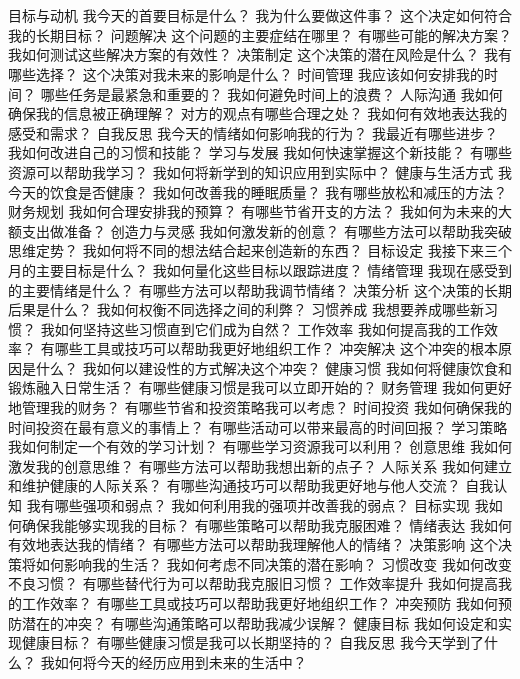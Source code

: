 \documentclass[12pt]{book}
\begin{document}
\section{}
目标与动机
我今天的首要目标是什么？
我为什么要做这件事？
这个决定如何符合我的长期目标？
问题解决
这个问题的主要症结在哪里？
有哪些可能的解决方案？
我如何测试这些解决方案的有效性？
决策制定
这个决策的潜在风险是什么？
我有哪些选择？
这个决策对我未来的影响是什么？
时间管理
我应该如何安排我的时间？
哪些任务是最紧急和重要的？
我如何避免时间上的浪费？
人际沟通
我如何确保我的信息被正确理解？
对方的观点有哪些合理之处？
我如何有效地表达我的感受和需求？
自我反思
我今天的情绪如何影响我的行为？
我最近有哪些进步？
我如何改进自己的习惯和技能？
学习与发展
我如何快速掌握这个新技能？
有哪些资源可以帮助我学习？
我如何将新学到的知识应用到实际中？
健康与生活方式
我今天的饮食是否健康？
我如何改善我的睡眠质量？
我有哪些放松和减压的方法？
财务规划
我如何合理安排我的预算？
有哪些节省开支的方法？
我如何为未来的大额支出做准备？
创造力与灵感
我如何激发新的创意？
有哪些方法可以帮助我突破思维定势？
我如何将不同的想法结合起来创造新的东西？
目标设定
我接下来三个月的主要目标是什么？
我如何量化这些目标以跟踪进度？
情绪管理
我现在感受到的主要情绪是什么？
有哪些方法可以帮助我调节情绪？
决策分析
这个决策的长期后果是什么？
我如何权衡不同选择之间的利弊？
习惯养成
我想要养成哪些新习惯？
我如何坚持这些习惯直到它们成为自然？
工作效率
我如何提高我的工作效率？
有哪些工具或技巧可以帮助我更好地组织工作？
冲突解决
这个冲突的根本原因是什么？
我如何以建设性的方式解决这个冲突？
健康习惯
我如何将健康饮食和锻炼融入日常生活？
有哪些健康习惯是我可以立即开始的？
财务管理
我如何更好地管理我的财务？
有哪些节省和投资策略我可以考虑？
时间投资
我如何确保我的时间投资在最有意义的事情上？
有哪些活动可以带来最高的时间回报？
学习策略
我如何制定一个有效的学习计划？
有哪些学习资源我可以利用？
创意思维
我如何激发我的创意思维？
有哪些方法可以帮助我想出新的点子？
人际关系
我如何建立和维护健康的人际关系？
有哪些沟通技巧可以帮助我更好地与他人交流？
自我认知
我有哪些强项和弱点？
我如何利用我的强项并改善我的弱点？
目标实现
我如何确保我能够实现我的目标？
有哪些策略可以帮助我克服困难？
情绪表达
我如何有效地表达我的情绪？
有哪些方法可以帮助我理解他人的情绪？
决策影响
这个决策将如何影响我的生活？
我如何考虑不同决策的潜在影响？
习惯改变
我如何改变不良习惯？
有哪些替代行为可以帮助我克服旧习惯？
工作效率提升
我如何提高我的工作效率？
有哪些工具或技巧可以帮助我更好地组织工作？
冲突预防
我如何预防潜在的冲突？
有哪些沟通策略可以帮助我减少误解？
健康目标
我如何设定和实现健康目标？
有哪些健康习惯是我可以长期坚持的？
自我反思
我今天学到了什么？
我如何将今天的经历应用到未来的生活中？
\end{document}

